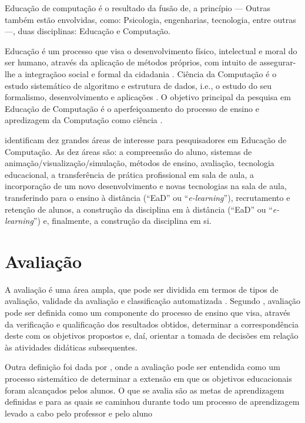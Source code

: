 \documentclass[
	12pt,				%
	openright,			%
	oneside,
	a4paper,			%
	english,			%
	french,				%
	spanish,			%
	brazil,				%
	]{abntex2}
\begin{document}
Educação de computação é o resultado da fusão de, a princípio --- Outras também estão envolvidas, como: Psicologia, engenharias, tecnologia, entre outras ---, duas disciplinas: Educação e Computação. 

Educação é um processo que visa o desenvolvimento físico, intelectual e moral do ser humano, através da aplicação de métodos próprios, com intuito de assegurar-lhe a integraçãoo social e formal da cidadania \cite{weiszflog1999michaelis}. Ciência da Computação é o estudo sistemático de algoritmo e estrutura de dados, i.e., o estudo do seu formalismo, desenvolvimento e aplicações  \cite{gibbs1986model}. O objetivo principal da pesquisa em Educação de Computação é o aperfeiçoamento do processo de ensino e apredizagem da Computação como ciência  \cite{holmboe2001research}.

 identificam dez grandes áreas de interesse para pesquisadores em Educação de Computação. As dez áreas são: a compreensão do aluno, sistemas de animação/visualização/simulação, métodos de ensino, avaliação, tecnologia educacional, a transferência de prática profissional em sala de aula, a incorporação de um novo desenvolvimento e novas tecnologias na sala de aula, transferindo para o ensino à distância (“EaD” ou “\textit{e-learning}”), recrutamento e retenção de alunos, a construção da disciplina em à distância (“EaD” ou “\textit{e-learning}”) e, finalmente, a construção da disciplina em si. 


\section{Avaliação}
\label{sec:AVA}
A avaliação é uma área ampla, que pode ser dividida em termos de tipos de avaliação, validade da avaliação e classificação automatizada \cite{fincher2005mapping}. Segundo , avaliação pode ser definida como um componente do processo de ensino que visa, através da verificação e qualificação dos resultados obtidos, determinar a correspondência  deste com os objetivos propostos e, daí, orientar a tomada de decisões em relação às atividades didáticas subsequentes.

Outra definição foi dada por , onde a avaliação pode ser entendida como um processo sistemático de determinar a extensão em que os objetivos educacionais foram alcançados pelos alunos. O que se avalia são as metas de aprendizagem definidas e para as quais se caminhou durante todo um processo de aprendizagem levado a cabo pelo professor e pelo aluno
\end{document}
